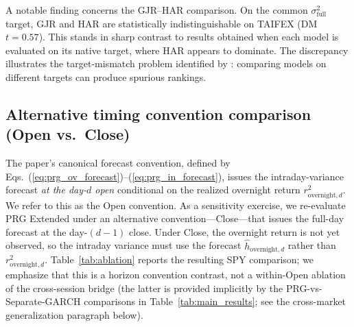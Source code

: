 \documentclass[11pt,a4paper]{article}
\begin{document}
A notable finding concerns the GJR--HAR comparison. On the common $\sigma^2_{\text{full}}$ target, GJR and HAR are statistically indistinguishable on TAIFEX (DM $t = 0.57$). This stands in sharp contrast to results obtained when each model is evaluated on its native target, where HAR appears to dominate. The discrepancy illustrates the target-mismatch problem identified by \citet{Patton2011}: comparing models on different targets can produce spurious rankings.

\subsection{Alternative timing convention comparison (Open vs.\ Close)}
\label{sec:timing_convention}

The paper's canonical forecast convention, defined by Eqs.~(\ref{eq:prg_ov_forecast})--(\ref{eq:prg_in_forecast}), issues the intraday-variance forecast \emph{at the day-$d$ open} conditional on the realized overnight return $r^2_{\text{overnight},d}$. We refer to this as the Open convention. As a sensitivity exercise, we re-evaluate PRG Extended under an alternative convention---Close---that issues the full-day forecast at the day-$(d-1)$ close. Under Close, the overnight return is not yet observed, so the intraday variance must use the forecast $\hat h_{\text{overnight},d}$ rather than $r^2_{\text{overnight},d}$. Table~\ref{tab:ablation} reports the resulting SPY comparison; we emphasize that this is a horizon convention contrast, not a within-Open ablation of the cross-session bridge (the latter is provided implicitly by the PRG-vs-Separate-GARCH comparisons in Table~\ref{tab:main_results}; see the cross-market generalization paragraph below).
\end{document}
